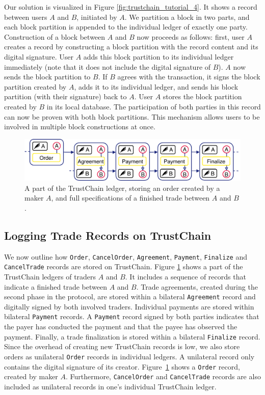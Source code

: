 Our solution is visualized in Figure \ref{fig:trustchain_tutorial_4}.
It shows a record between users $ A $ and $ B $, initiated by $ A $.
We partition a block in two parts, and each block partition is appended to the individual ledger of exactly one party.
Construction of a block between $ A $ and $ B $ now proceeds as follows: first, user $ A $ creates a record by constructing a block partition with the record content and its digital signature.
User $ A $ adds this block partition to its individual ledger immediately (note that it does not include the digital signature of $ B $).
$ A $ now sends the block partition to $ B $.
If $ B $ agrees with the transaction, it signs the block partition created by $ A $, adds it to its individual ledger, and sends his block partition (with their signature) back to $ A $.
User $ A $ stores the block partition created by $ B $ in its local database.
The participation of both parties in this record can now be proven with both block partitions.
This mechanism allows users to be involved in multiple block constructions at once.

\begin{figure}[t]
	\centering
	\includegraphics[width=.8\linewidth]{xchange/assets/trustchain_market}
	\caption{A part of the TrustChain ledger, storing an order created by a maker $ A $, and full specifications of a finished trade between $ A $ and $ B $.}
	\label{fig:trustchain_market}
\end{figure}

\subsection{Logging Trade Records on TrustChain}
We now outline how \texttt{Order}, \texttt{CancelOrder}, \texttt{Agreement}, \texttt{Payment}, \texttt{Finalize} and \texttt{CancelTrade} records are stored on TrustChain.
Figure \ref{fig:trustchain_market} shows a part of the TrustChain ledgers of traders $ A $ and $ B $.
It includes a sequence of records that indicate a finished trade between $ A $ and $ B $.
Trade agreements, created during the second phase in the \ModelName{} protocol, are stored within a bilateral \texttt{Agreement} record and digitally signed by both involved traders.
Individual payments are stored within bilateral \texttt{Payment} records.
A \texttt{Payment} record signed by both parties indicates that the payer has conducted the payment and that the payee has observed the payment.
Finally, a trade finalization is stored within a bilateral \texttt{Finalize} record.
Since the overhead of creating new TrustChain records is low, we also store orders as unilateral \texttt{Order} records in individual ledgers.
A unilateral record only contains the digital signature of its creator.
Figure~\ref{fig:trustchain_market} shows a \texttt{Order} record, created by maker $ A $.
Furthermore, \texttt{CancelOrder} and \texttt{CancelTrade} records are also included as unilateral records in one's individual TrustChain ledger.

